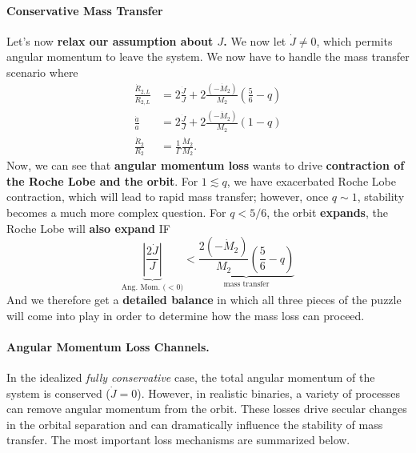 \paragraph{Conservative Mass Transfer}

Let's now \textbf{relax our assumption about $J$.} We now let $\dot{J} \neq 0$, which permits angular momentum to leave the system. We now have to handle the mass transfer scenario where
\[
\begin{aligned}
    \frac{\dot{R}_{2,L}}{R_{2,L}} &= 2\frac{\dot{J}}{J} +2\frac{(-\dot{M}_2)}{M_2}\left(\frac{5}{6}-q\right)\\
    \frac{\dot{a}}{a} &= 2\frac{\dot{J}}{J}+2\frac{(-\dot{M}_2)}{M_2}\left(1-q\right)\\
    \frac{\dot{R}_2}{R_2} &= \frac{1}{\Gamma} \frac{\dot{M}_2}{M_2}.
\end{aligned}
\]
Now, we can see that \textbf{angular momentum loss} wants to drive \textbf{contraction of the Roche Lobe and the orbit}. For $1 \lesssim q$, we have exacerbated Roche Lobe contraction, which will lead to rapid mass transfer; however, once $q \sim 1$, stability becomes a much more complex question. For $q < 5/6$, the orbit \textbf{expands}, the Roche Lobe will \textbf{also expand} IF 
\[
\underbrace{\left|\frac{2\dot{J}}{J}\right|}_{\text{Ang. Mom. ($<0$)}} < \underbrace{\frac{2(-\dot{M}_2)}{M_2} \left(\frac{5}{6} -q \right) }_{\text{mass transfer}}
\]
And we therefore get a \textbf{detailed balance} in which all three pieces of the puzzle will come into play in order to determine how the mass loss can proceed.

\paragraph{Angular Momentum Loss Channels.}
In the idealized \emph{fully conservative} case, the total angular momentum of the system is conserved ($\dot{J}=0$).  
However, in realistic binaries, a variety of processes can remove angular momentum from the orbit.  
These losses drive secular changes in the orbital separation and can dramatically influence the stability of mass transfer.  
The most important loss mechanisms are summarized below.


